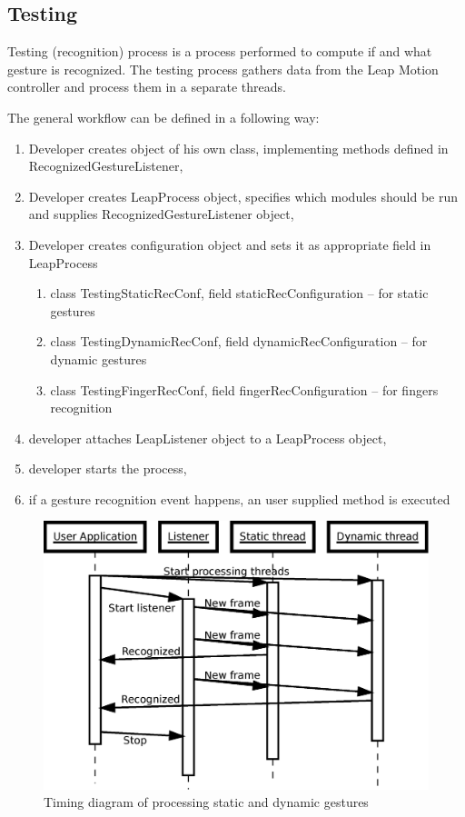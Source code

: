 \subsection{Testing}

Testing (recognition) process is a process performed to compute if and what gesture is recognized. 
The testing process gathers data from the Leap Motion controller and process them in a separate threads.

The general workflow can be defined in a following way:
\begin{enumerate}
  \item Developer creates object of his own class, implementing methods defined in RecognizedGestureListener,
  \item Developer creates LeapProcess object, specifies which modules should be run and supplies RecognizedGestureListener object,
  \item Developer creates configuration object and sets it as appropriate field in LeapProcess
  \begin{enumerate}
  	\item class TestingStaticRecConf, field staticRecConfiguration -- for static gestures
  	\item class TestingDynamicRecConf, field dynamicRecConfiguration -- for dynamic gestures
  	\item class TestingFingerRecConf, field fingerRecConfiguration -- for fingers recognition
  \end{enumerate}
  \item developer attaches LeapListener object to a LeapProcess object,
  \item developer starts the process,
  \item if a gesture recognition event happens, an user supplied method is executed
\end{enumerate}

\begin{figure}[htb]
\centering
 \includegraphics[width=0.8\columnwidth]{figures/timeline.eps}
 \caption[]{Timing diagram of processing static and dynamic gestures}
 \label{processingtimeline}
\end{figure}

